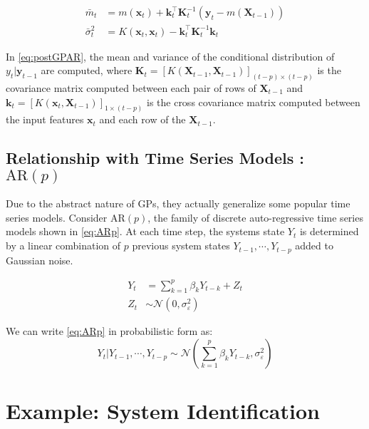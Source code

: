 \begin{equation}\label{eq:postGPAR}
    \begin{aligned}
        \bar{m}_t &= m(\mathbf{x}_t) + 
        \mathbf{k}_{t}^{\intercal}\mathbf{K}_{t}^{-1}\left( \mathbf{y}_t - m(\mathbf{X}_{t-1}) \right) \\
        \bar{\sigma}^{2}_{t} &= K(\mathbf{x}_t, \mathbf{x}_t) - 
        \mathbf{k}_{t}^{\intercal} \mathbf{K}_{t}^{-1} \mathbf{k}_{t}
    \end{aligned}
\end{equation}

In \cref{eq:postGPAR}, the mean and variance of the conditional distribution of $y_t \rvert \mathbf{y}_{t-1}$ are 
computed, where $\mathbf{K}_{t} = [K(\mathbf{X}_{t-1}, \mathbf{X}_{t-1})]_{(t-p) \times (t-p)}$ is the 
covariance matrix computed between each pair of rows of $\mathbf{X}_{t-1}$ and 
$\mathbf{k}_{t} = [K(\mathbf{x}_t, \mathbf{X}_{t-1})]_{1 \times (t-p)}$ is the cross covariance matrix computed 
between the input features $\mathbf{x}_t$ and each row of the $\mathbf{X}_{t-1}$.

\subsection*{Relationship with Time Series Models : $\mathrm{AR}(p)$}

Due to the abstract nature of GPs, they actually generalize some popular time series models. Consider 
$\mathrm{AR}(p)$, the family of discrete auto-regressive time series models shown in \cref{eq:ARp}. At each 
time step, the systems state $Y_t$ is determined by a linear combination of $p$ previous system states 
$Y_{t-1}, \cdots, Y_{t-p}$ added to Gaussian noise.  

\begin{align}
    Y_t &= \sum^{p}_{k = 1}{\beta_{k}Y_{t-k}} + Z_t \label{eq:ARp} \\
    Z_t &\sim \mathcal{N}(0, \sigma^{2}_{\varepsilon})
\end{align}

We can write \cref{eq:ARp} in probabilistic form as: 
\begin{equation*}
    Y_t \rvert Y_{t-1}, \cdots, Y_{t-p} \sim \mathcal{N}(\sum^{p}_{k = 1}{\beta_{k}Y_{t-k}}, \sigma^{2}_{\varepsilon})
\end{equation*}


\section*{Example: System Identification}


